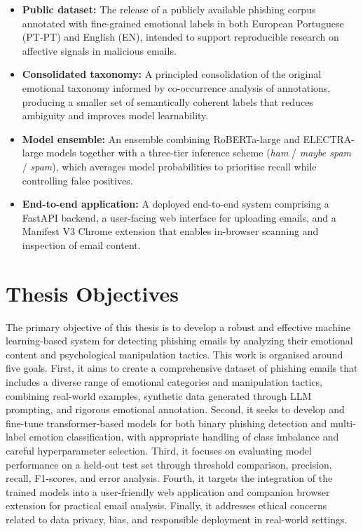 \begin{itemize}
    \item \textbf{Public dataset:} The release of a publicly available phishing corpus annotated with fine-grained emotional labels in both European Portuguese (PT-PT) and English (EN), intended to support reproducible research on affective signals in malicious emails.

    \item \textbf{Consolidated taxonomy:} A principled consolidation of the original emotional taxonomy informed by co-occurrence analysis of annotations, producing a smaller set of semantically coherent labels that reduces ambiguity and improves model learnability.

    \item \textbf{Model ensemble:} An ensemble combining \ac{RoBERTa}-large and \ac{ELECTRA}-large models together with a three-tier inference scheme (\textit{ham} / \textit{maybe spam} / \textit{spam}), which averages model probabilities to prioritise recall while controlling false positives.

    \item \textbf{End-to-end application:} A deployed end-to-end system comprising a FastAPI backend, a user-facing web interface for uploading emails, and a Manifest V3 Chrome extension that enables in-browser scanning and inspection of email content.
\end{itemize}

\section{Thesis Objectives}
The primary objective of this thesis is to develop a robust and effective machine learning-based system for detecting phishing emails by analyzing their emotional content and psychological manipulation tactics. This work is organised around five goals. First, it aims to create a comprehensive dataset of phishing emails that includes a diverse range of emotional categories and manipulation tactics, combining real-world examples, synthetic data generated through \acs{LLM} prompting, and rigorous emotional annotation. Second, it seeks to develop and fine-tune transformer-based models for both binary phishing detection and multi-label emotion classification, with appropriate handling of class imbalance and careful hyperparameter selection. Third, it focuses on evaluating model performance on a held-out test set through threshold comparison, precision, recall, F1-scores, and error analysis. Fourth, it targets the integration of the trained models into a user-friendly web application and companion browser extension for practical email analysis. Finally, it addresses ethical concerns related to data privacy, bias, and responsible deployment in real-world settings.

